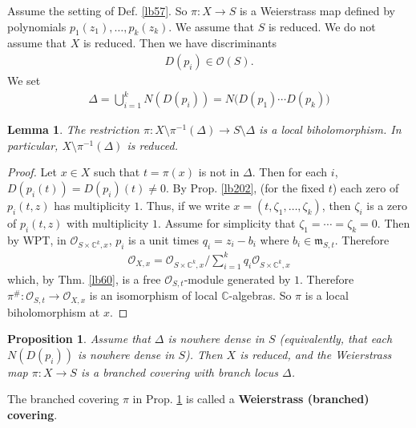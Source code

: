 \documentclass[12pt,b5paper,notitlepage]{report}
\theoremstyle{definition}
\theoremstyle{plain}
\newtheorem{pp}[df]{Proposition}
\newtheorem{lm}[df]{Lemma}
\newcommand{\fk}{\mathfrak}
\newcommand{\scr}{\mathscr}
\newcommand{\Cbb}{\mathbb C}
\numberwithin{equation}{section}
\begin{document}
Assume the setting of Def. \ref{lb57}. So $\pi:X\rightarrow S$ is a Weierstrass map defined by polynomials $p_1(z_1),\dots,p_k(z_k)$. We assume that $S$ is reduced. We do not assume that $X$ is reduced. Then we have discriminants
\begin{align*}
D(p_i)\in\scr O(S).
\end{align*}
We set
\begin{align*}
\Delta=\bigcup_{i=1}^k N(D(p_i))=N\big(D(p_1)\cdots D(p_k)\big)
\end{align*}


\begin{lm}\label{lb204}
The restriction $\pi:X\setminus\pi^{-1}(\Delta)\rightarrow S\setminus\Delta$ is a local biholomorphism. In particular, $X\setminus\pi^{-1}(\Delta)$ is reduced.
\end{lm}


\begin{proof}
Let $x\in X$ such that $t=\pi(x)$ is not in $\Delta$. Then for each $i$, $D(p_i(t))=D(p_i)(t)\neq 0$. By Prop. \ref{lb202}, (for the fixed $t$) each zero of $p_i(t,z)$ has multiplicity $1$. Thus, if we write $x=(t,\zeta_1,\dots,\zeta_k)$, then $\zeta_i$ is a zero of $p_i(t,z)$ with multiplicity $1$. Assume for simplicity that $\zeta_1=\cdots=\zeta_k=0$. Then by WPT, in $\scr O_{S\times\Cbb^k,x}$, $p_i$ is a unit times $q_i=z_i-b_i$ where $b_i\in\fk m_{S,t}$. Therefore
\begin{align*}
\scr O_{X,x}=\scr O_{S\times\Cbb^k,x}\Big/\sum_{i=1}^k q_i\scr O_{S\times\Cbb^k,x}
\end{align*}
which, by Thm. \ref{lb60}, is a free $\scr O_{S,t}$-module generated by $1$. Therefore $\pi^\#:\scr O_{S,t}\rightarrow\scr O_{X,x}$ is an isomorphism of local $\Cbb$-algebras. So $\pi$ is a local biholomorphism at $x$. 
\end{proof}




\begin{pp}\label{lb206}
Assume that $\Delta$ is nowhere dense in $S$ (equivalently, that each $N(D(p_i))$ is nowhere dense in $S$). Then $X$ is reduced, and the Weierstrass map $\pi:X\rightarrow S$ is a branched covering with branch locus $\Delta$.
\end{pp}

The branched covering $\pi$ in Prop. \ref{lb206} is called a \textbf{Weierstrass (branched) covering}.  
\end{document}

